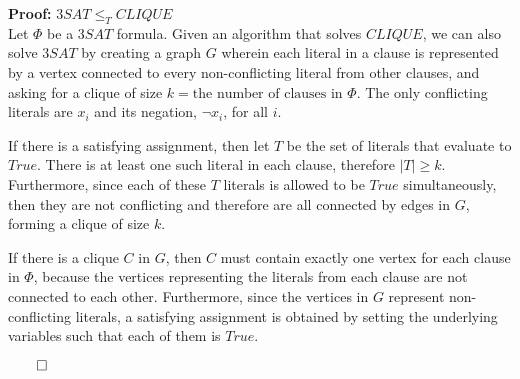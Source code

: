 \documentclass{amsart}
\begin{document}
\noindent
\textbf{Proof:} $3SAT \le_T CLIQUE$\\

Let $\Phi$ be a $3SAT$ formula. Given an algorithm that solves $CLIQUE$, we can also solve $3SAT$ by creating a graph $G$ wherein each literal in a clause is represented by a vertex connected to every non-conflicting literal from other clauses, and asking for a clique of size $k = \text{the number of clauses in } \Phi$. The only conflicting literals are $x_i$ and its negation, $\lnot x_i$, for all $i$.

If there is a satisfying assignment, then let $T$ be the set of literals that evaluate to $True$. There is at least one such literal in each clause, therefore $|T| \ge k$. Furthermore, since each of these $T$ literals is allowed to be $True$ simultaneously, then they are not conflicting and therefore are all connected by edges in $G$, forming a clique of size $k$.

If there is a clique $C$ in $G$, then $C$ must contain exactly one vertex for each clause in $\Phi$, because the vertices representing the literals from each clause are not connected to each other. Furthermore, since the vertices in $G$ represent non-conflicting literals, a satisfying assignment is obtained by setting the underlying variables such that each of them is $True$.

\hfill$\qed$
\end{document}
